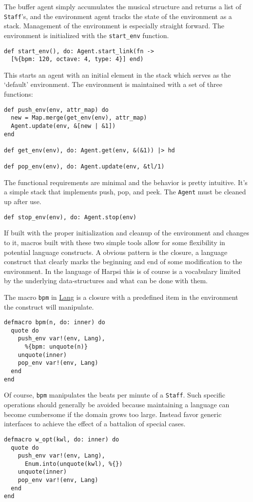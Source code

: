 \documentclass[11pt]{article}
\begin{document}
The buffer agent simply accumulates the musical structure and
returns a list of \verb~Staff~'s, and the environment agent tracks the
state of the environment as a stack. Management of the environment
is especially straight forward. The environment is initialized with
the \verb~start_env~ function.
\begin{verbatim}
def start_env(), do: Agent.start_link(fn -> 
  [%{bpm: 120, octave: 4, type: 4}] end)
\end{verbatim}
This starts an agent with an initial element in the stack which
serves as the `default' environment. The environment is maintained
with a set of three functions:
\begin{verbatim}
def push_env(env, attr_map) do
  new = Map.merge(get_env(env), attr_map)
  Agent.update(env, &[new | &1])
end

def get_env(env), do: Agent.get(env, &(&1)) |> hd

def pop_env(env), do: Agent.update(env, &tl/1)
\end{verbatim}
The functional requirements are minimal and the behavior
is pretty intuitive. It's a simple stack that implements push, pop,
and peek. The \verb~Agent~ must be cleaned up after use.
\begin{verbatim}
def stop_env(env), do: Agent.stop(env)
\end{verbatim}

If built with the proper initialization and cleanup of the
environment and changes to it, macros built with these two simple
tools allow for some flexibility in potential language
constructs. A obvious pattern is the closure, a language construct
that clearly marks the beginning and end of some modification to
the environment. In the language of Harpsi this is of course is a
vocabulary limited by the underlying data-structures and what can
be done with them.

The macro \verb~bpm~ in \href{lib/lang.ex}{Lang} is a closure with a predefined item in the
environment the construct will manipulate.
\begin{verbatim}
defmacro bpm(n, do: inner) do
  quote do
    push_env var!(env, Lang),
      %{bpm: unquote(n)}
    unquote(inner)
    pop_env var!(env, Lang)
  end
end
\end{verbatim}
Of course, \verb~bpm~ manipulates the beats per minute of a
\verb~Staff~. Such specific operations should generally be avoided
because maintaining a language can become cumbersome if the domain
grows too large. Instead favor generic interfaces to achieve the
effect of a battalion of special cases.
\begin{verbatim}
defmacro w_opt(kwl, do: inner) do
  quote do
    push_env var!(env, Lang),
      Enum.into(unquote(kwl), %{})
    unquote(inner)
    pop_env var!(env, Lang)
  end
end
\end{verbatim}
\end{document}
